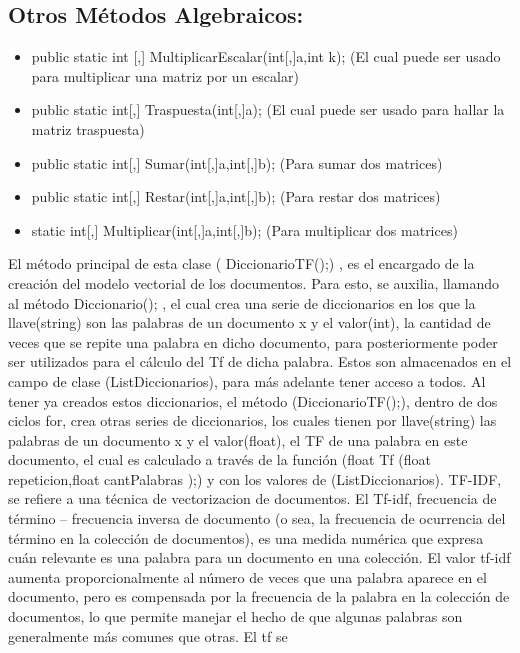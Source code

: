 \documentclass[a4paper,12pt]{article}
\begin{document}
        \subsection*{Otros Métodos Algebraicos:}
        \begin{itemize}
            \item public static int [,] MultiplicarEscalar(int[,]a,int k); (El cual puede ser usado para 
            multiplicar una matriz por un escalar)
            \item public static int[,] Traspuesta(int[,]a); (El cual puede ser usado para hallar la matriz 
            traspuesta)
            \item public static int[,] Sumar(int[,]a,int[,]b); (Para sumar dos matrices)
            \item public static int[,] Restar(int[,]a,int[,]b); (Para restar dos matrices)
            \item static int[,] Multiplicar(int[,]a,int[,]b); (Para multiplicar dos matrices)
        \end{itemize}
        El método principal de esta clase ( DiccionarioTF();) , es el encargado de la creación del modelo 
vectorial de los documentos. Para esto, se auxilia, llamando al método Diccionario(); , el cual 
crea una serie de diccionarios en los que la llave(string) son las palabras de un documento x y 
el valor(int), la cantidad de veces que se repite una palabra en dicho documento, para 
posteriormente poder ser utilizados para el cálculo del Tf de dicha palabra. Estos son 
almacenados en el campo de clase (ListDiccionarios), para más adelante tener acceso a todos. 
Al tener ya creados estos diccionarios, el método (DiccionarioTF();), dentro de dos ciclos for, 
crea otras series de diccionarios, los cuales tienen por llave(string) las palabras de un 
documento x y el valor(float), el TF de una palabra en este documento, el cual es calculado a 
través de la función (float Tf (float repeticion,float cantPalabras );) y con los valores de 
(ListDiccionarios). TF-IDF, se refiere a una técnica de vectorizacion de documentos. El Tf-idf, 
frecuencia de término – frecuencia inversa de documento (o sea, la frecuencia de ocurrencia 
del término en la colección de documentos), es una medida numérica que expresa cuán 
relevante es una palabra para un documento en una colección. El valor tf-idf aumenta 
proporcionalmente al número de veces que una palabra aparece en el documento, pero es compensada por la frecuencia de la palabra en la colección de documentos, lo que permite 
manejar el hecho de que algunas palabras son generalmente más comunes que otras. El tf se 
\end{document}
